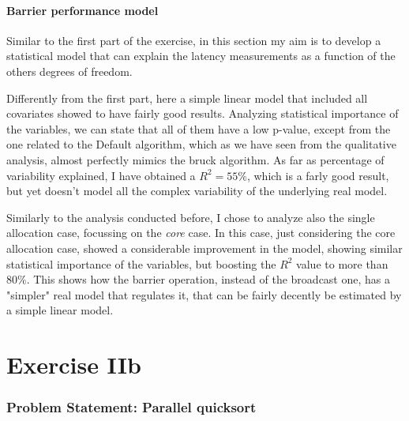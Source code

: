 \documentclass{article}
\begin{document}
	\subsection{Barrier performance model}
	
	Similar to the first part of the exercise, in this section my aim is to develop a statistical model that can explain the latency measurements as a function of the others degrees of freedom.
	
	Differently from the first part, here a simple linear model that included all covariates showed to have fairly good results.
	Analyzing statistical importance of the variables, we can state that all of them have a low p-value, except from the one related to the Default algorithm, which as we have seen from the qualitative analysis, almost perfectly mimics the bruck algorithm.
	As far as percentage of variability explained, I have obtained a $R^2=55\%$, which is a farly good result, but yet doesn't model all the complex variability of the underlying real model.
	
	\begin{center}
		
	\end{center}
	
	
	Similarly to the analysis conducted before, I chose to analyze also the single allocation case, focussing on the \textit{core} case.
	In this case, just considering the core allocation case, showed a considerable improvement in the model, showing similar statistical importance of the variables, but boosting the $R^2$ value to more than $80\%$. This shows how the barrier operation, instead of the broadcast one, has a "simpler" real model that regulates it, that can be fairly decently be estimated by a simple linear model.
	
	\begin{center}
		
	\end{center}
	
	
	
	\newpage
	
	\part{Exercise IIb}
	
	\section{Problem Statement: Parallel quicksort}
	
\end{document}
